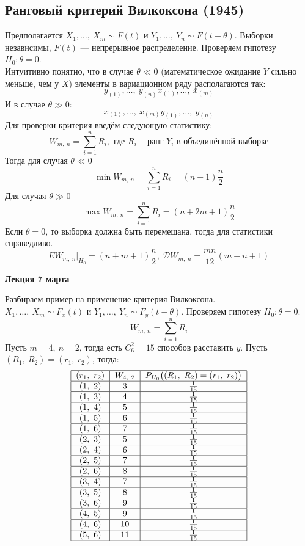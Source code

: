 \documentclass[12pt, a4paper]{article}
\newcommand{\dev}{\mathcal{D}}
\begin{document}
\subsection*{Ранговый критерий Вилкоксона (1945)}
Предполагается $X_1,\dots,\ X_m \sim F(t)$ и $Y_1,\dots,\ Y_n \sim F(t - \theta)$. Выборки независимы, $F(t)$ --- непрерывное распределение. Проверяем гипотезу $H_0: \theta = 0$.\\
Интуитивно понятно, что в случае $\theta \ll 0$ (математическое ожидание $Y$ сильно меньше, чем у $X$) элементы в вариационном ряду располагаются так:
\[y_{(1)},\dots,\ y_{(n)} x_{(1)},\dots,\ x_{(m)}\]
И в случае $\theta \gg 0$:
\[x_{(1)},\dots,\ x_{(m)} y_{(1)},\dots,\ y_{(n)}\]
Для проверки критерия введём следующую статистику:
\[W_{m,\ n} = \sum_{i = 1}^{n} R_{i},\text{ где }R_i-\text{ранг $Y_{i}$ в объединённой выборке}\]
Тогда для случая $\theta \ll 0$
\[\min W_{m,\ n} = \sum_{i = 1}^{n} R_i = (n + 1)\frac{n}{2}\]
Для случая $\theta \gg 0$
\[\max W_{m,\ n} = \sum_{i = 1}^{n} R_i = (n + 2m + 1)\frac{n}{2}\]
Если $\theta = 0$, то выборка должна быть перемешана, тогда для статистики справедливо.
\[EW_{m,\ n}\big|_{H_0} = (n + m + 1)\frac{n}{2},\ \dev W_{m,\ n} = \frac{mn}{12}(m + n + 1)\]
\begin{center}
    \bf Лекция 7 марта
\end{center}
Разбираем пример на применение критерия Вилкоксона.\\
$X_1,\dots,\ X_m \sim F_{x}(t)$ и $Y_1,\dots,\ Y_n \sim F_{y}(t - \theta)$. Проверяем гипотезу $H_0: \theta = 0$.
\[W_{m,\ n} = \sum_{i = 1}^{n} R_i\]
Пусть $m = 4,\ n = 2$, тогда есть $C^2_6 = 15$ способов расставить $y$. Пусть $(R_1,\ R_2) = (r_1,\ r_2)$, тогда: 
\[\begin{tabular}{|c|c|c|}
    \hline
    $(r_1,\ r_2)$ & $W_{4,\ 2}$ & $P_{H_0}\big( (R_1,\ R_2) = (r_1,\ r_2) \big)$\\
    \hline
    $ (1,\ 2) $ & 3 & $\frac{1}{15}$\\
    \hline
    $ (1,\ 3) $ & 4 & $\frac{1}{15}$\\ 
    \hline
    $ (1,\ 4) $ & 5 & $\frac{1}{15}$\\ 
    \hline
    $ (1,\ 5) $ & 6 & $\frac{1}{15}$\\ 
    \hline
    $ (1,\ 6) $ & 7 & $\frac{1}{15}$\\ 
    \hline
    $ (2,\ 3) $ & 5 & $\frac{1}{15}$\\ 
    \hline
    $ (2,\ 4) $ & 6 & $\frac{1}{15}$\\ 
    \hline
    $ (2,\ 5) $ & 7 & $\frac{1}{15}$\\ 
    \hline
    $ (2,\ 6) $ & 8 & $\frac{1}{15}$\\ 
    \hline
    $ (3,\ 4) $ & 7 & $\frac{1}{15}$\\ 
    \hline
    $ (3,\ 5) $ & 8 & $\frac{1}{15}$\\ 
    \hline
    $ (3,\ 6) $ & 9 & $\frac{1}{15}$\\ 
    \hline
    $ (4,\ 5) $ & 9 & $\frac{1}{15}$\\ 
    \hline
    $ (4,\ 6) $ & 10 & $\frac{1}{15}$\\ 
    \hline
    $ (5,\ 6) $ & 11 & $\frac{1}{15}$\\ 
    \hline
\end{tabular}\]
\end{document}

